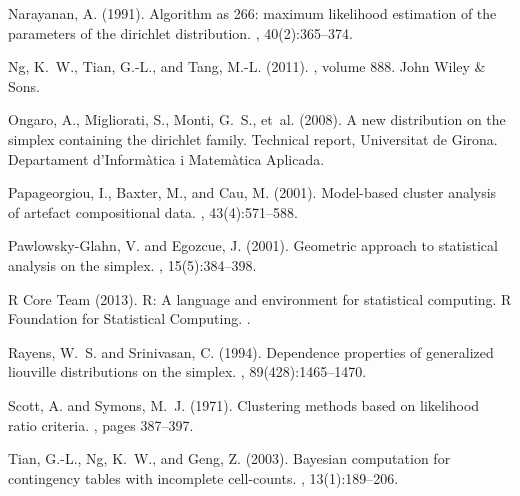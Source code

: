 \documentclass[10pt, a4paper]{article}
\begin{document}
\begin{thebibliography}{00}
Narayanan, A. (1991).
\newblock Algorithm as 266: maximum likelihood estimation of the parameters of
  the dirichlet distribution.
, 40(2):365--374.

Ng, K.~W., Tian, G.-L., and Tang, M.-L. (2011).
, volume 888.
\newblock John Wiley \& Sons.

Ongaro, A., Migliorati, S., Monti, G.~S., et~al. (2008).
\newblock A new distribution on the simplex containing the dirichlet family.
\newblock Technical report, Universitat de Girona. Departament
  d'Inform{\`a}tica i Matem{\`a}tica Aplicada.

Papageorgiou, I., Baxter, M., and Cau, M. (2001).
\newblock Model-based cluster analysis of artefact compositional data.
, 43(4):571--588.


Pawlowsky-Glahn, V. and Egozcue, J. (2001).
\newblock Geometric approach to statistical analysis on the simplex.
,
  15(5):384--398.

R Core Team (2013).
\newblock R: A language and environment for statistical computing. R Foundation for Statistical Computing.
.

Rayens, W.~S. and Srinivasan, C. (1994).
\newblock Dependence properties of generalized liouville distributions on the
  simplex.
,
  89(428):1465--1470.

Scott, A. and Symons, M.~J. (1971).
\newblock Clustering methods based on likelihood ratio criteria.
, pages 387--397.

Tian, G.-L., Ng, K.~W., and Geng, Z. (2003).
\newblock Bayesian computation for contingency tables with incomplete
  cell-counts.
, 13(1):189--206.

\end{thebibliography}
\end{document}
